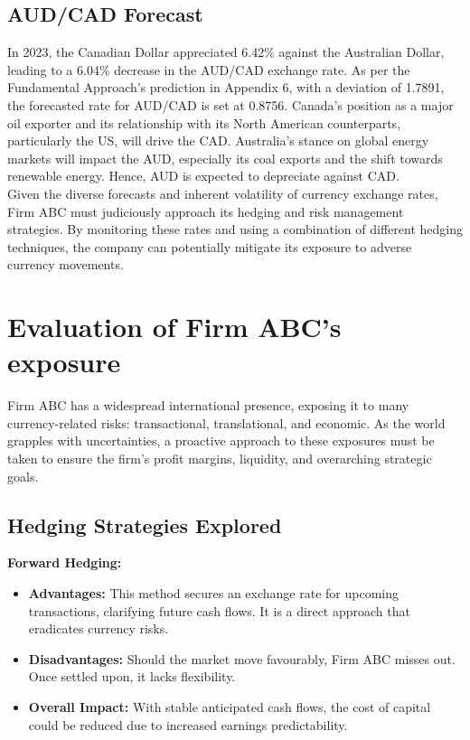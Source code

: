 \documentclass{article}
\let\Oldsubsection\subsection
\renewcommand{\subsection}{\FloatBarrier\Oldsubsection}
\begin{document}
\break

\subsection*{AUD/CAD Forecast}

\noindent In 2023, the Canadian Dollar appreciated 6.42\% against the Australian Dollar, leading to a 6.04\% decrease in the AUD/CAD exchange rate. As per the Fundamental Approach's prediction in Appendix 6, with a deviation of 1.7891, the forecasted rate for AUD/CAD is set at 0.8756. Canada's position as a major oil exporter and its relationship with its North American counterparts, particularly the US, will drive the CAD. Australia's stance on global energy markets will impact the AUD, especially its coal exports and the shift towards renewable energy. Hence, AUD is expected to depreciate against CAD.\\


\noindent Given the diverse forecasts and inherent volatility of currency exchange rates, Firm ABC must judiciously approach its hedging and risk management strategies. By monitoring these rates and using a combination of different hedging techniques, the company can potentially mitigate its exposure to adverse currency movements.\\

\section*{Evaluation of Firm ABC's exposure}

Firm ABC has a widespread international presence, exposing it to many currency-related risks: transactional, translational, and economic. As the world grapples with uncertainties, a proactive approach to these exposures must be taken to ensure the firm's profit margins, liquidity, and overarching strategic goals.\\

\subsection*{Hedging Strategies Explored}

\noindent \textbf{Forward Hedging:}\\
\begin{itemize}
    \item \textbf{Advantages:} This method secures an exchange rate for upcoming transactions, clarifying future cash flows. It is a direct approach that eradicates currency risks.
    \item \textbf{Disadvantages:} Should the market move favourably, Firm ABC misses out. Once settled upon, it lacks flexibility.
    \item \textbf{Overall Impact:} With stable anticipated cash flows, the cost of capital could be reduced due to increased earnings predictability.\\
\end{itemize}
\end{document}
